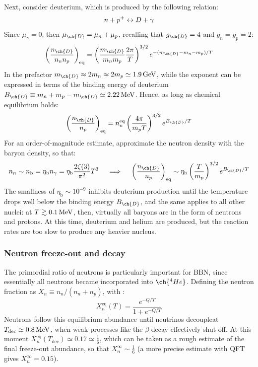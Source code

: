 Next, consider deuterium, which is produced by the following relation:
\begin{equation*}
  n + p^+ \leftrightarrow D + \gamma
\end{equation*}
Since $ \mu_\gamma = 0 $, then $ \mu_{\ch{D}} = \mu_n + \mu_p $, recalling that $ g_{\ch{D}} = 4 $ and $ g_n = g_p = 2 $:
\begin{equation}
  \left( \frac{n_{\ch{D}}}{n_n n_p} \right)_\text{eq} = \left( \frac{m_{\ch{D}}}{m_n m_p} \frac{2\pi}{T} \right)^{3/2} e^{- (m_{\ch{D}} - m_n - m_p) / T}
\end{equation}
In the prefactor $ m_{\ch{D}} \approx 2m_n \approx 2m_p \simeq 1.9 \gev $, while the exponent can be expressed in terms of the binding energy of deuterium $ B_{\ch{D}} \equiv m_n + m_p - m_{\ch{D}} \simeq 2.22 \mev $. Hence, as long as chemical equilibrium holds:
\begin{equation*}
  \left( \frac{n_{\ch{D}}}{n_p} \right)_\text{eq} = n_n^\text{eq} \left( \frac{4\pi}{m_p T} \right)^{3/2} e^{B_{\ch{D}} / T}
\end{equation*}
For an order-of-magnitude estimate, approximate the neutron density with the baryon density, so that:
\begin{equation*}
  n_n \sim n_\text{b} = \eta_\text{b} n_\gamma = \eta_\text{b} \frac{2\zeta(3)}{\pi^2} T^3
  \quad \implies \quad
  \left( \frac{n_{\ch{D}}}{n_p} \right)_\text{eq} \sim \eta_\text{b} \left( \frac{T}{m_p} \right)^{3/2} e^{B_{\ch{D}} / T}
\end{equation*}
The smallness of $ \eta_\text{b} \sim 10^{-9} $ inhibits deuterium production until the temperature drops well below the binding energy $ B_{\ch{D}} $, and the same applies to all other nuclei: at $ T \gtrsim 0.1 \,\mathrm{MeV} $, then, virtually all baryons are in the form of neutrons and protons. At this time, deuterium and helium are produced, but the reaction rates are too slow to produce any heavier nucleus.

\subsubsection{Neutron freeze-out and decay}

The primordial ratio of neutrons is particularly important for BBN, since essentially all neutrons became incorporated into $ \ch{^4He} $. Defining the neutron fraction as $ X_n \equiv n_n / (n_n + n_p) $, with :
\begin{equation}
  X_n^\text{eq}(T) = \frac{e^{-Q/T}}{1 + e^{-Q/T}}
\end{equation}
Neutrons follow this equilibrium abundance until neutrinos decouple\footnotemark at $ T_\text{dec} \simeq 0.8 \,\mathrm{MeV} $, when weak processes like the $ \beta $-decay effectively shut off. At this moment $ X_n^\text{eq}(T_\text{dec}) \simeq 0.17 \simeq \frac{1}{6} $, which can be taken as a rough estimate of the final freeze-out abundance, so that $ X_n^\infty \sim \frac{1}{6} $ (a more precise estimate with QFT gives $ X_n^\infty = 0.15 $).

